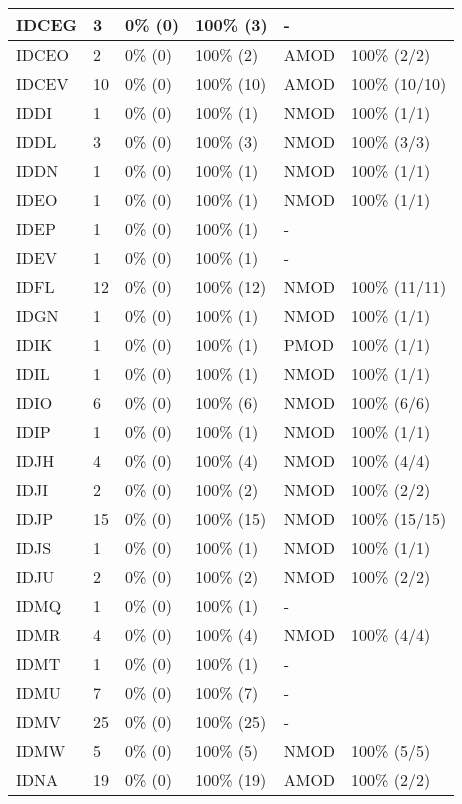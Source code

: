 \begin{figure*}
\begin{tabular}{|l|l|l|l||l|l|}
\hline
 IDCEG & 3 & 0\% (0) & 100\% (3) & - &  \\ 
\hline
 IDCEO & 2 & 0\% (0) & 100\% (2) & AMOD & 100\% (2/2) \\ 
\hline
 IDCEV & 10 & 0\% (0) & 100\% (10) & AMOD & 100\% (10/10) \\ 
\hline
 IDDI & 1 & 0\% (0) & 100\% (1) & NMOD & 100\% (1/1) \\ 
\hline
 IDDL & 3 & 0\% (0) & 100\% (3) & NMOD & 100\% (3/3) \\ 
\hline
 IDDN & 1 & 0\% (0) & 100\% (1) & NMOD & 100\% (1/1) \\ 
\hline
 IDEO & 1 & 0\% (0) & 100\% (1) & NMOD & 100\% (1/1) \\ 
\hline
 IDEP & 1 & 0\% (0) & 100\% (1) & - &  \\ 
\hline
 IDEV & 1 & 0\% (0) & 100\% (1) & - &  \\ 
\hline
 IDFL & 12 & 0\% (0) & 100\% (12) & NMOD & 100\% (11/11) \\ 
\hline
 IDGN & 1 & 0\% (0) & 100\% (1) & NMOD & 100\% (1/1) \\ 
\hline
 IDIK & 1 & 0\% (0) & 100\% (1) & PMOD & 100\% (1/1) \\ 
\hline
 IDIL & 1 & 0\% (0) & 100\% (1) & NMOD & 100\% (1/1) \\ 
\hline
 IDIO & 6 & 0\% (0) & 100\% (6) & NMOD & 100\% (6/6) \\ 
\hline
 IDIP & 1 & 0\% (0) & 100\% (1) & NMOD & 100\% (1/1) \\ 
\hline
 IDJH & 4 & 0\% (0) & 100\% (4) & NMOD & 100\% (4/4) \\ 
\hline
 IDJI & 2 & 0\% (0) & 100\% (2) & NMOD & 100\% (2/2) \\ 
\hline
 IDJP & 15 & 0\% (0) & 100\% (15) & NMOD & 100\% (15/15) \\ 
\hline
 IDJS & 1 & 0\% (0) & 100\% (1) & NMOD & 100\% (1/1) \\ 
\hline
 IDJU & 2 & 0\% (0) & 100\% (2) & NMOD & 100\% (2/2) \\ 
\hline
 IDMQ & 1 & 0\% (0) & 100\% (1) & - &  \\ 
\hline
 IDMR & 4 & 0\% (0) & 100\% (4) & NMOD & 100\% (4/4) \\ 
\hline
 IDMT & 1 & 0\% (0) & 100\% (1) & - &  \\ 
\hline
 IDMU & 7 & 0\% (0) & 100\% (7) & - &  \\ 
\hline
 IDMV & 25 & 0\% (0) & 100\% (25) & - &  \\ 
\hline
 IDMW & 5 & 0\% (0) & 100\% (5) & NMOD & 100\% (5/5) \\ 
\hline
 IDNA & 19 & 0\% (0) & 100\% (19) & AMOD & 100\% (2/2) \\ 
\hline
\end{tabular}
\end{figure*}
